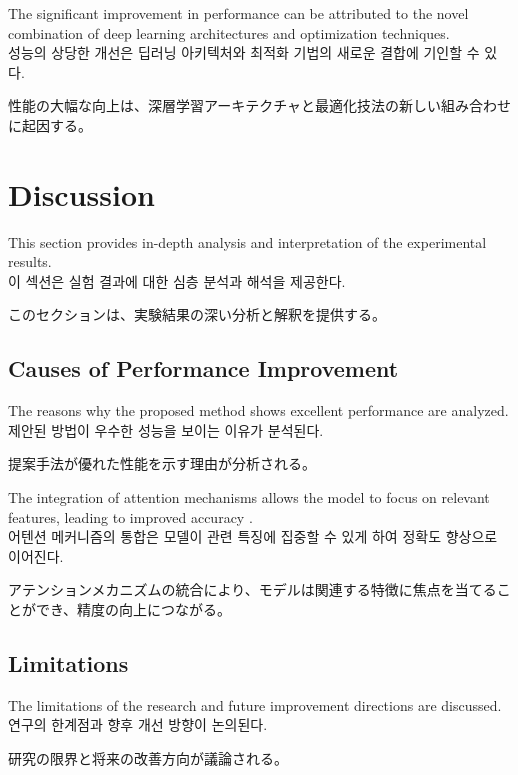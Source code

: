 \documentclass[12pt,a4paper]{article}
\begin{document}
The significant improvement in performance can be attributed to the novel combination of deep learning architectures and optimization techniques. \\
성능의 상당한 개선은 딥러닝 아키텍처와 최적화 기법의 새로운 결합에 기인할 수 있다. \\
\begin{CJK}{UTF8}{min}
性能の大幅な向上は、深層学習アーキテクチャと最適化技法の新しい組み合わせに起因する。
\end{CJK}

\section{Discussion}
\label{sec:discussion}

This section provides in-depth analysis and interpretation of the experimental results. \\
이 섹션은 실험 결과에 대한 심층 분석과 해석을 제공한다. \\
\begin{CJK}{UTF8}{min}
このセクションは、実験結果の深い分析と解釈を提供する。
\end{CJK}

\subsection{Causes of Performance Improvement}
The reasons why the proposed method shows excellent performance are analyzed. \\
제안된 방법이 우수한 성능을 보이는 이유가 분석된다. \\
\begin{CJK}{UTF8}{min}
提案手法が優れた性能を示す理由が分析される。
\end{CJK}

The integration of attention mechanisms allows the model to focus on relevant features, leading to improved accuracy \cite{bahdanau2014neural}. \\
어텐션 메커니즘의 통합은 모델이 관련 특징에 집중할 수 있게 하여 정확도 향상으로 이어진다. \\
\begin{CJK}{UTF8}{min}
アテンションメカニズムの統合により、モデルは関連する特徴に焦点を当てることができ、精度の向上につながる。
\end{CJK}

\subsection{Limitations}
The limitations of the research and future improvement directions are discussed. \\
연구의 한계점과 향후 개선 방향이 논의된다. \\
\begin{CJK}{UTF8}{min}
研究の限界と将来の改善方向が議論される。
\end{CJK}
\end{document}
